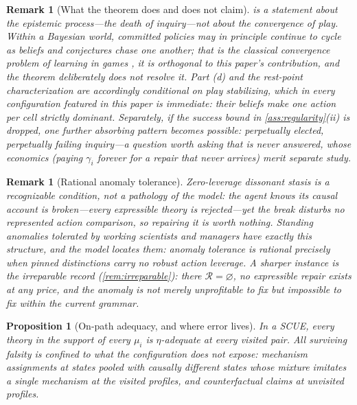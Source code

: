 \documentclass[11pt]{article}
\newtheorem{proposition}[assumption]{Proposition}
\newtheorem{remark}[assumption]{Remark}
\theoremstyle{definition}
\newcommand{\emptysetset}{\varnothing}
\begin{document}
\begin{remark}[What the theorem does and does not claim]
\label{rem:scope}
 is a statement about the epistemic process---the death
of inquiry---not about the convergence of play.  Within a Bayesian world,
committed policies may in principle continue to cycle as beliefs and
conjectures chase one another; that is the classical convergence problem of
learning in games \citep{FudenbergLevine1993,KalaiLehrer1993a}, it is
orthogonal to this paper's contribution, and the theorem deliberately does
not resolve it.  Part (d) and the rest-point characterization are
accordingly conditional on play stabilizing, which in every configuration
featured in this paper is immediate: their beliefs make one action per cell
strictly dominant.  Separately, if the success bound in
\cref{ass:regularity}(ii) is dropped, one further absorbing pattern becomes
possible: perpetually elected, perpetually failing inquiry---a question
worth asking that is never answered, whose economics (paying $\gamma_i$
forever for a repair that never arrives) merit separate study.
\end{remark}

\begin{remark}[Rational anomaly tolerance]
\label{rem:anomaly}
Zero-leverage dissonant stasis is a recognizable condition, not a
pathology of the model: the agent knows its causal account is
broken---every expressible theory is rejected---yet the break disturbs no
represented action comparison, so repairing it is worth nothing.  Standing
anomalies tolerated by working scientists and managers have exactly this
structure, and the model locates them: anomaly tolerance is rational
precisely when pinned distinctions carry no robust action leverage.  A
sharper instance is the irreparable record (\cref{rem:irreparable}): there
$\mathcal R=\emptysetset$, no expressible repair exists at any price, and
the anomaly is not merely unprofitable to fix but impossible to fix within
the current grammar.
\end{remark}

\begin{proposition}[On-path adequacy, and where error lives]
\label{prop:adequacy}
In a SCUE, every theory in the support of every $\mu_i$ is $\eta$-adequate
at every visited pair.  All surviving falsity is confined to what the
configuration does not expose: mechanism assignments at states pooled with
causally different states whose mixture imitates a single mechanism at the
visited profiles, and counterfactual claims at unvisited profiles.
\end{proposition}
\end{document}

